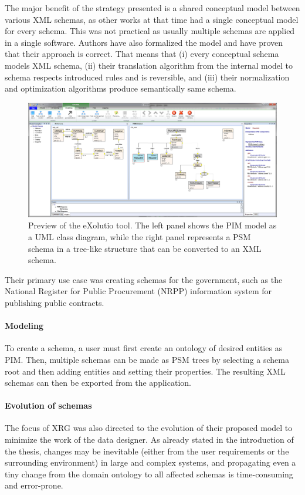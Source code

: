 The major benefit of the strategy presented is a shared conceptual model between various XML schemas, as other works at that time had a single conceptual model for every schema. This was not practical as usually multiple schemas are applied in a single software. Authors have also formalized the model and have proven that their approach is correct. That means that (i) every conceptual schema models XML schema, (ii) their translation algorithm from the internal model to schema respects introduced rules and is reversible, and (iii) their normalization and optimization algorithms produce semantically same schema.

\begin{figure}
    \centering
    \includegraphics[width=\textwidth]{img/exolutio.png}
    \caption{Preview of the eXolutio tool. The left panel shows the PIM model as a UML class diagram, while the right panel represents a PSM schema in a tree-like structure that can be converted to an XML schema.}
    \label{fig:exolutio}
\end{figure}

Their primary use case was creating schemas for the government, such as the National Register for Public Procurement (NRPP) information system for publishing public contracts.

\paragraph{Modeling} To create a schema, a user must first create an ontology of desired entities as PIM. Then, multiple schemas can be made as PSM trees by selecting a schema root and then adding entities and setting their properties. The resulting XML schemas can then be exported from the application.

\paragraph{Evolution of schemas} The focus of XRG was also directed to the evolution \cite{nevcasky2012evolution} of their proposed model to minimize the work of the data designer. As already stated in the introduction of the thesis, changes may be inevitable (either from the user requirements or the surrounding environment) in large and complex systems, and propagating even a tiny change from the domain ontology to all affected schemas is time-consuming and error-prone.

